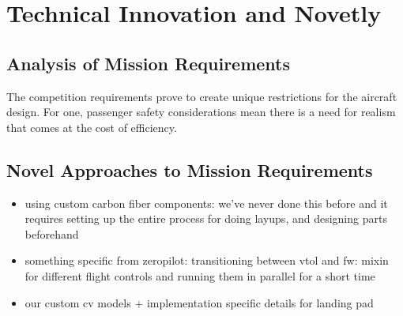 \section{Technical Innovation and Novetly}
\label{sec:technical}

% 

\subsection{Analysis of Mission Requirements}

The competition requirements prove to create unique restrictions for the
aircraft design. For one, passenger safety considerations mean there is a need
for realism that comes at the cost of efficiency.

\subsection{Novel Approaches to Mission Requirements}


\begin{itemize}
	\item using custom carbon fiber components: we've never done this before
		and it requires setting up the entire process for doing layups,
		and designing parts beforehand
	\item something specific from zeropilot: transitioning between vtol and fw:
		mixin for different flight controls and running them in parallel for a
		short time
	\item our custom cv models + implementation specific details for landing pad
\end{itemize}
